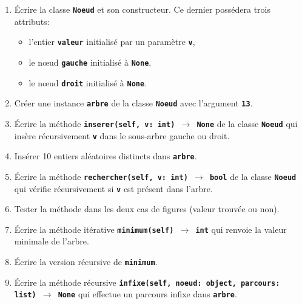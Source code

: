 \documentclass[a4paper,11pt]{article}
\begin{document}
\begin{exo}
    \begin{enumerate}
        \item Écrire la classe \textbf{\texttt{Noeud}} et son constructeur. Ce dernier possédera trois attributs:
              \begin{itemize}
                  \item l'entier \textbf{\texttt{valeur}} initialisé par un paramètre \textbf{\texttt{v}},
                  \item le nœud \textbf{\texttt{gauche}} initialisé à \textbf{\texttt{None}},
                  \item le nœud \textbf{\texttt{droit}} initialisé à \textbf{\texttt{None}}.
              \end{itemize}
        \item Créer une instance \textbf{\texttt{arbre}} de la classe \textbf{\texttt{Noeud}} avec l'argument \textbf{\texttt{13}}.
              \begin{center}
                  \label{noeud}
              \end{center}
        \item Écrire la méthode \textbf{\texttt{inserer(self, v: int) $\rightarrow$ None}} de la classe \textbf{\texttt{Noeud}} qui insère récursivement \textbf{\texttt{v}} dans le sous-arbre gauche ou droit.
        \item Insérer 10 entiers aléatoires distincts dans \textbf{\texttt{arbre}}.
        \item Écrire la méthode \textbf{\texttt{rechercher(self, v: int) $\rightarrow$ bool}} de la classe \textbf{\texttt{Noeud}} qui vérifie récursivement si \textbf{\texttt{v}} est présent dans l'arbre.
        \item Tester la méthode dans les deux cas de figures (valeur trouvée ou non).
        \item Écrire la méthode itérative \textbf{\texttt{minimum(self) $\rightarrow$ int}} qui renvoie la valeur minimale de l'arbre.
        \item Écrire la version récursive de \textbf{\texttt{minimum}}.
        \item Écrire la méthode récursive \textbf{\texttt{infixe(self, noeud: object, parcours: list) $\rightarrow$ None}} qui effectue un parcours infixe dans \textbf{\texttt{arbre}}.
    \end{enumerate}
\end{exo}
\end{document}
